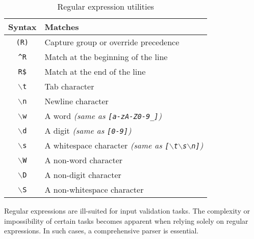 \begin{table}[H]
    \centering
    \begin{tabular}{c|l}
        \textbf{Syntax}                 & \textbf{Matches}                                                                                         \\ \hline
            \texttt{(R)}                & Capture group or override precedence                                                                     \\
            \texttt{\textasciicircum R} & Match at the beginning of the line                                                                       \\
            \texttt{R\$}                & Match at the end of the line                                                                             \\
            \texttt{$\backslash$t}   & Tab character                                                                                            \\
            \texttt{$\backslash$n}   & Newline character                                                                                        \\
            \texttt{$\backslash$w}   & A word \textit{(same as \texttt{[a-zA-Z0-9\_]})}                                                         \\
            \texttt{$\backslash$d}   & A digit \textit{(same as \texttt{[0-9]})   }                                                             \\
            \texttt{$\backslash$s}   & A whitespace character \textit{(same as \texttt{[$\backslash$t$\backslash$s$\backslash$n]})} \\
            \texttt{$\backslash$W}   & A non-word character                                                                                     \\
            \texttt{$\backslash$D}   & A non-digit character                                                                                    \\
            \texttt{$\backslash$S}   & A non-whitespace character                                                                               \\
    \end{tabular}
    \caption{Regular expression utilities}
\end{table}
Regular expressions are ill-suited for input validation tasks. 
The complexity or impossibility of certain tasks becomes apparent when relying solely on regular expressions. 
In such cases, a comprehensive parser is essential.

